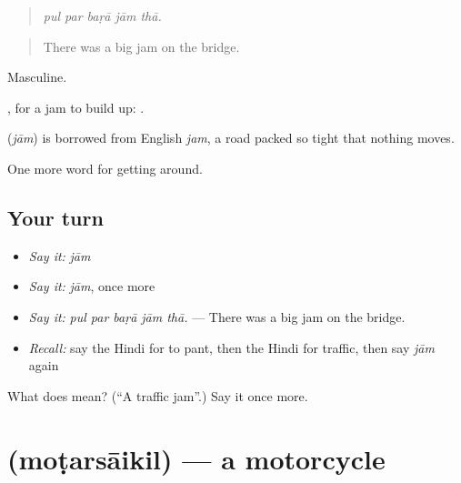 \begin{quote}
    
\end{quote}

\begin{quote}
\emph{pul par baṛā jām thā.}
\end{quote}

\begin{quote}
There was a big jam on the bridge.
\end{quote}

Masculine.

 , for a jam to build up:     .

\begin{cousinweb}
\textbf{} (\emph{jām}) is borrowed from English \emph{jam}, a road packed so tight that nothing moves.
\end{cousinweb}

\begin{grammarlens}[title={What you've built}]
One more word for getting around.
\end{grammarlens}

\subsection*{Your turn}
\begin{itemize}
\raggedright
  \item \emph{Say it:} \emph{jām}
  \item \emph{Say it:} \emph{jām}, once more
  \item \emph{Say it:} \emph{pul par baṛā jām thā.} — There was a big jam on the bridge.
  \item \emph{Recall:} say the Hindi for to pant, then the Hindi for traffic, then say \emph{jām} again
\end{itemize}

\begin{tcolorbox}[breakable,colback=teal!4,colframe=teal!35!black,title={Before you move on}]
What does  mean? (\textquotedblleft{}A traffic jam\textquotedblright{}.) Say it once more.
\end{tcolorbox}
\section[\texorpdfstring{\hi{मोटरसाइकिल} (moṭarsāikil)}{मोटरसाइकिल (moṭarsāikil)}]{ (moṭarsāikil) — a motorcycle}

